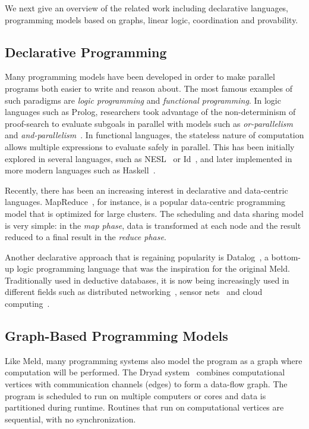 We next give an overview of the related work including declarative languages, programming models
based on graphs, linear logic, coordination and provability.

\subsection{Declarative Programming}

Many programming models have been developed in order to make parallel programs both easier to write and reason about. The most famous examples of such paradigms are \emph{logic programming} and \emph{functional programming}.
In logic languages such as Prolog, researchers took advantage of the non-determinism of proof-search to evaluate subgoals
in parallel with models such as \emph{or-parallelism} and \emph{and-parallelism}~\cite{Gupta:2001:PEP:504083.504085}.
In functional languages, the stateless nature of computation allows multiple expressions to evaluate safely in parallel.
This has been initially explored in several languages, such as NESL~\cite{Blelloch:1996:PPA:227234.227246} or Id~\cite{Nikhil93anoverview}, and later implemented in more modern languages such as Haskell~\cite{Chakravarty07dataparallel}.

Recently, there has been an increasing interest in declarative and data-centric languages.
MapReduce~\cite{Dean:2008:MSD:1327452.1327492}, for instance, is a popular data-centric programming
model that is optimized for large clusters. The scheduling and data sharing model is very simple:
in the \emph{map phase}, data is transformed at each node and the result reduced to a final
result in the \emph{reduce phase}.

Another declarative approach that is regaining popularity is Datalog~\cite{Ullman:1990:PDK:533142}, a
bottom-up logic programming language that was the inspiration for the original Meld.
Traditionally used in deductive databases, it is now being increasingly used in different fields
such as distributed networking~\cite{Loo-condie-garofalakis-p2}, sensor
nets~\cite{Chu:2007:DID:1322263.1322281} and cloud computing~\cite{alvaro:boom}.

\subsection{Graph-Based Programming Models}

Like Meld, many programming systems also model the program as a graph where computation will be performed.
The Dryad system~\cite{Isard:2007:DDD:1272996.1273005} combines computational vertices
with communication channels (edges) to form a data-flow graph. The program is scheduled to
run on multiple computers or cores and data is partitioned during runtime. Routines that run on computational vertices
are sequential, with no synchronization.

